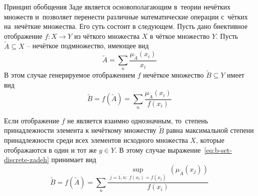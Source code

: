 Принцип обобщения Заде является основополагающим в~теории нечётких множеств и~позволяет перенести различные математические операции с~чётких на~нечёткие множества. Его суть состоит в следующем. Пусть дано биективное отображение $f:X\to Y$ из чёткого множества $X$ в чёткое множество $Y$. Пусть $\tilde{A}\subseteq X$ – нечёткое подмножество, имеющее вид
\begin{equation}
\label{eq:a-set-discrete-zadeh}
	\tilde A=\sum\limits_{n} \frac{\mu_{\tilde A}\left( x_i \right)}{x_i}
\end{equation}
В этом случае генерируемое отображением $f$ нечёткое множество $\tilde{B}\subseteq Y$ имеет вид
\begin{equation}
\label{eq:b-set-discrete-zadeh}
	\tilde{B}=f\left( {\tilde{A}} \right)=\sum\limits_{n}{\frac{{{\mu }_{{\tilde{A}}}}\left( {{x}_{i}} \right)}{f\left( {{x}_{i}} \right)}}
\end{equation}

Если отображение $f$ не является взаимно однозначным, то~степень принадлежности элемента к нечёткому множеству $\tilde B$ равна максимальной степени принадлежности среди всех элементов исходного множества $X$, которые отображаются в один и тот же $y\in Y$. В этому случае выражение~\eqref{eq:b-set-discrete-zadeh} принимает вид
\begin{equation}
\label{eq:b-set-zadeh}
	\tilde B=f\left( \tilde A \right)=\sum\limits_{n}{\frac{\underset{j=\overline{1,n}:\ f\left( {{x}_{i}} \right)=f\left( x_j \right)}{\mathop{\sup }}\,\left( {{\mu }_{{\tilde{A}}}}\left( x_j \right) \right)}{f\left( x_i \right)}}
\end{equation}

